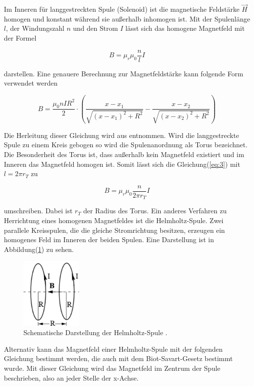 Im Inneren für langgestreckten Spule (Solenoid) ist die magnetische Feldstärke $\vec{H}$
homogen und konstant während sie außerhalb inhomogen ist.
Mit der Spulenlänge $l$, der Windungszahl $n$ und den Strom $I$ lässt sich das
homogene Magnetfeld mit der Formel

\begin{equation}
  B = \mu_r \mu_0 \frac{n}{l} I
  \label{eq:3}
\end{equation}

darstellen.
Eine genauere Berechnung zur Magnetfeldstärke kann folgende Form verwendet werden

\begin{equation}
  B= \frac{\mu_0 n I R^2}{2} \cdot (\frac{x-x_1}{\sqrt{(x-x_1)^2 +R^2}} - \frac{x-x_2}{\sqrt{(x-x_2)^2 +R^2}})
  \label{eq:7}
\end{equation}

Die Herleitung dieser Gleichung wird aus \cite{2} entnommen.
Wird die langgestreckte Spule zu einem Kreis gebogen so wird die Spulenanordnung
als Torus bezeichnet. Die Besonderheit des Torus ist, dass außerhalb kein Magnetfeld
existiert und im Inneren das Magnetfeld homogen ist. Somit lässt sich die Gleichung(\ref{eq:3})
mit $l= 2\pi r_T$ zu

\begin{equation}
  B = \mu_r \mu_0 \frac{n}{2\pi r_T} I
  \label{eq:4}
\end{equation}

umschreiben. Dabei ist $r_T$ der Radius des Torus.
Ein anderes Verfahren zu Herrichtung eines homogenen Magnetfeldes ist die Helmholtz-Spule.
Zwei parallele Kreisspulen, die die gleiche Stromrichtung besitzen, erzeugen ein homogenes
Feld im Inneren der beiden Spulen. Eine Darstellung ist in Abbildung(\ref{abb:2}) zu sehen.

\begin{figure}[H]
  \centering
\includegraphics[width =5 cm, height = 3.5cm]{Abb2.png}
\caption{Schematische Darstellung der Helmholtz-Spule \cite{1}.}
\label{abb:2}
\end{figure}

Alternativ kann das Magnetfeld einer Helmholtz-Spule mit der folgenden Gleichung bestimmt
werden, die auch mit dem Biot-Savart-Gesetz bestimmt wurde. Mit dieser Gleichung wird das
Magnetfeld im Zentrum der Spule beschrieben, also an jeder Stelle der x-Achse.

